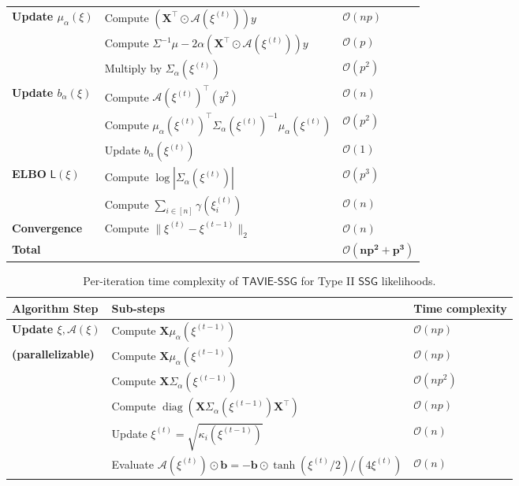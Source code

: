 \documentclass[12pt]{article}
\numberwithin{equation}{section}
\newcommand{\ssg}{\mathsf{SSG}}
\newcommand{\tssg}{\mathsf{TAVIE}\text{-}\mathsf{SSG}}
\begin{document}
{\begin{table}[H]
\begin{tabular}{lll}
\midrule
\textbf{Update $\mu_{\alpha}(\xi)$} 
& Compute $(\mathbf{X}^\top \odot \mathcal{A}(\xi^{(t)})) y$ & $\mathcal{O}(np)$ \\
& Compute $\Sigma^{-1}\mu - 2\alpha(\mathbf{X}^\top \odot \mathcal{A}(\xi^{(t)})) y$ & $\mathcal{O}(p)$ \\
& Multiply by $\Sigma_{\alpha}(\xi^{(t)})$ & $\mathcal{O}(p^2)$ \\

\midrule
\textbf{Update $b_{\alpha}(\xi)$} 
& Compute $\mathcal{A}(\xi^{(t)})^\top (y^2)$ & $\mathcal{O}(n)$ \\
& Compute $\mu_{\alpha}(\xi^{(t)})^\top \Sigma_{\alpha}(\xi^{(t)})^{-1} \mu_{\alpha}(\xi^{(t)})$ & $\mathcal{O}(p^2)$ \\
& Update $b_{\alpha}(\xi^{(t)})$ & $\mathcal{O}(1)$ \\

\midrule
\textbf{ELBO} $\mathsf{L}(\xi)$
& Compute $\log |\Sigma_{\alpha}(\xi^{(t)})|$ & $\mathcal{O}(p^3)$ \\
& Compute $\sum_{i \in [n]} \gamma(\xi_i^{(t)})$ & $\mathcal{O}(n)$ \\

\midrule
\textbf{Convergence} 
& Compute $\|\xi^{(t)} - \xi^{(t-1)}\|_2$ & $\mathcal{O}(n)$ \\

\midrule
\textbf{Total} & & $\mathbf{\mathcal{O}(np^2 + p^3)}$ \\
\bottomrule
\bottomrule
\end{tabular}
\end{table}

\begin{table}[H]
\centering
\caption{\footnotesize{Per-iteration time complexity of $\tssg$ for Type II $\ssg$ likelihoods.}}
\label{tab:type-2-time-complexity}
\footnotesize
\renewcommand{\arraystretch}{1.2}
\begin{tabular}{lll}
\toprule
\toprule
\textbf{Algorithm Step} & \textbf{Sub-steps} & \textbf{Time complexity} \\
\midrule

\textbf{Update $\xi,\mathcal{A}(\xi)$} 
& Compute $\mathbf{X} \mu_{\alpha}(\xi^{(t-1)})$ & $\mathcal{O}(np)$ \\
\textbf{(parallelizable)}& Compute $\mathbf{X} \mu_{\alpha}(\xi^{(t-1)})$ & $\mathcal{O}(np)$ \\
& Compute $\mathbf{X} \Sigma_{\alpha}(\xi^{(t-1)})$ & $\mathcal{O}(np^2)$ \\
& Compute $\operatorname{diag}(\mathbf{X} \Sigma_{\alpha}(\xi^{(t-1)}) \mathbf{X}^\top)$ & $\mathcal{O}(np)$ \\
& Update $\xi^{(t)} = \sqrt{\kappa_i(\xi^{(t-1)})}$ & $\mathcal{O}(n)$ \\
& Evaluate $\mathcal{A}(\xi^{(t)})\odot \mathbf{b} = -\mathbf{b} \odot \tanh(\xi^{(t)}/2)/(4\xi^{(t)})$ & $\mathcal{O}(n)$ \\


\end{tabular}
\end{table}}
\end{document}
